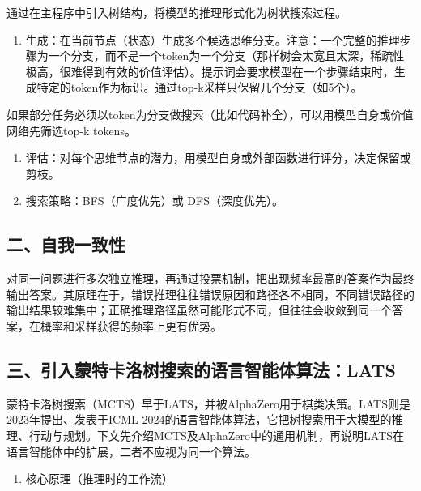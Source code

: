 通过在主程序中引入树结构，将模型的推理形式化为树状搜索过程。

\begin{enumerate}
\def\labelenumi{\arabic{enumi}.}
\tightlist
\item
  生成：在当前节点（状态）生成多个候选思维分支。注意：一个完整的推理步骤为一个分支，而不是一个token为一个分支（那样树会太宽且太深，稀疏性极高，很难得到有效的价值评估）。提示词会要求模型在一个步骤结束时，生成特定的token作为标识。通过top-k采样只保留几个分支（如5个）。
\end{enumerate}

如果部分任务必须以token为分支做搜索（比如代码补全），可以用模型自身或价值网络先筛选top-k tokens。

\begin{enumerate}
\def\labelenumi{\arabic{enumi}.}
\setcounter{enumi}{1}
\item
  评估：对每个思维节点的潜力，用模型自身或外部函数进行评分，决定保留或剪枝。
\item
  搜索策略：BFS（广度优先）或 DFS（深度优先）。
\end{enumerate}

\hypertarget{ux4e8cux81eaux6211ux4e00ux81f4ux6027}{%
\subsection{二、自我一致性}\label{ux4e8cux81eaux6211ux4e00ux81f4ux6027}}

对同一问题进行多次独立推理，再通过投票机制，把出现频率最高的答案作为最终输出答案。其原理在于，错误推理往往错误原因和路径各不相同，不同错误路径的输出结果较难集中；正确推理路径虽然可能形式不同，但往往会收敛到同一个答案，在概率和采样获得的频率上更有优势。

\hypertarget{ux4e09ux5f15ux5165ux8499ux7279ux5361ux6d1bux6811ux641cux7d22ux7684ux8bedux8a00ux667aux80fdux4f53ux7b97ux6cd5lats}{%
\subsection{三、引入蒙特卡洛树搜索的语言智能体算法：LATS}\label{ux4e09ux5f15ux5165ux8499ux7279ux5361ux6d1bux6811ux641cux7d22ux7684ux8bedux8a00ux667aux80fdux4f53ux7b97ux6cd5lats}}

蒙特卡洛树搜索（MCTS）早于LATS，并被AlphaZero用于棋类决策。LATS则是2023年提出、发表于ICML 2024的语言智能体算法，它把树搜索用于大模型的推理、行动与规划。下文先介绍MCTS及AlphaZero中的通用机制，再说明LATS在语言智能体中的扩展，二者不应视为同一个算法。

\begin{enumerate}
\def\labelenumi{\arabic{enumi}.}
\tightlist
\item
  核心原理（推理时的工作流）
\end{enumerate}

